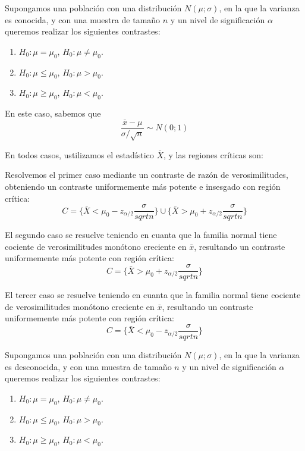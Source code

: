 
Supongamos una poblaci\'on con una distribuci\'on $N(\mu;\sigma)$, en la que la varianza es conocida, y con una muestra de tama\~no $n$ y un nivel de significaci\'on $\alpha$ queremos realizar los siguientes contrastes:
\begin{enumerate}
\item $H_0:\mu=\mu_0$, $H_0:\mu\neq\mu_0$.
\item $H_0:\mu\leq\mu_0$, $H_0:\mu>\mu_0$.
\item $H_0:\mu\geq\mu_0$, $H_0:\mu<\mu_0$.
\end{enumerate}

En este caso, sabemos que 
\[\dfrac{\bar{x}-\mu}{\sigma/\sqrt{n}}\sim N(0;1)\]

En todos casos, ustilizamos el estad\'istico $\bar{X}$, y las regiones cr\'iticas son:

Resolvemos el primer caso mediante un contraste de raz\'on de verosimilitudes, obteniendo un contraste uniformemente m\'as potente e insesgado con regi\'on cr\'itica:
\[C=\{\bar{X}<\mu_0-z_{\alpha/2}\dfrac{\sigma}{sqrt{n}}\} \cup \{\bar{X}>\mu_0+z_{\alpha/2}\dfrac{\sigma}{sqrt{n}}\}\]

El segundo caso se resuelve teniendo en cuanta que la familia normal tiene cociente de verosimilitudes mon\'otono creciente en $\bar{x}$, resultando un contraste uniformemente m\'as potente con regi\'on cr\'itica:
\[C= \{\bar{X}>\mu_0+z_{\alpha/2}\dfrac{\sigma}{sqrt{n}}\}\]

El tercer caso se resuelve teniendo en cuanta que la familia normal tiene cociente de verosimilitudes mon\'otono creciente en $\bar{x}$, resultando un contraste uniformemente m\'as potente con regi\'on cr\'itica:
\[C= \{\bar{X}<\mu_0-z_{\alpha/2}\dfrac{\sigma}{sqrt{n}}\}\]

Supongamos una poblaci\'on con una distribuci\'on $N(\mu;\sigma)$, en la que la varianza es desconocida, y con una muestra de tama\~no $n$ y un nivel de significaci\'on $\alpha$ queremos realizar los siguientes contrastes:
\begin{enumerate}
\item $H_0:\mu=\mu_0$, $H_0:\mu\neq\mu_0$.
\item $H_0:\mu\leq\mu_0$, $H_0:\mu>\mu_0$.
\item $H_0:\mu\geq\mu_0$, $H_0:\mu<\mu_0$.
\end{enumerate}

